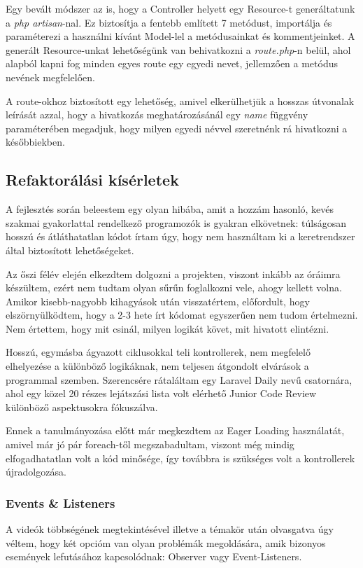 \documentclass[
]{thesis-ekf}
\theoremstyle{definition}
\theoremstyle{remark}
\begin{document}
                    Egy bevált módszer az is, hogy a Controller helyett egy Resource-t generáltatunk a \emph{php artisan}-nal. Ez biztosítja a fentebb említett 7 metódust, importálja és paraméterezi a használni kívánt Model-lel a metódusainkat és kommentjeinket. A generált Resource-unkat lehetőségünk van behivatkozni a \emph{route.php}-n belül, ahol alapból kapni fog minden egyes route egy egyedi nevet, jellemzően a metódus nevének megfelelően.

                    A route-okhoz biztosított egy lehetőség, amivel elkerülhetjük a hosszas útvonalak leírását azzal, hogy a hivatkozás meghatározásánál egy \emph{name} függvény paraméterében megadjuk, hogy milyen egyedi névvel szeretnénk rá hivatkozni a későbbiekben.
                    
                \subsection{Refaktorálási kísérletek}
                    A fejlesztés során beleestem egy olyan hibába, amit a hozzám hasonló, kevés szakmai gyakorlattal rendelkező programozók is gyakran elkövetnek: túlságosan hosszú és átláthatatlan kódot írtam úgy, hogy nem használtam ki a keretrendszer által biztosított lehetőségeket.

                    Az őszi félév elején elkezdtem dolgozni a projekten, viszont inkább az óráimra készültem, ezért nem tudtam olyan sűrűn foglalkozni vele, ahogy kellett volna. Amikor kisebb-nagyobb kihagyások után visszatértem, előfordult, hogy elszörnyülködtem, hogy a 2-3 hete írt kódomat egyszerűen nem tudom értelmezni. Nem értettem, hogy mit csinál, milyen logikát követ, mit hivatott elintézni.

                    Hosszú, egymásba ágyazott ciklusokkal teli kontrollerek, nem megfelelő elhelyezése a különböző logikáknak, nem teljesen átgondolt elvárások a programmal szemben. Szerencsére rátaláltam egy Laravel Daily nevű csatornára, ahol egy közel 20 részes lejátszási lista volt elérhető Junior Code Review\cite{LaravelDaily - CodeReview} különböző aspektusokra fókuszálva.

                    Ennek a tanulmányozása előtt már megkezdtem az Eager Loading használatát, amivel már jó pár foreach-től megszabadultam, viszont még mindig elfogadhatatlan volt a kód minősége, így továbbra is szükséges volt a kontrollerek újradolgozása.

                    \subsubsection{Events \& Listeners}
                    A videók többségének megtekintésével illetve a témakör után olvasgatva úgy véltem, hogy két opcióm van olyan problémák megoldására, amik bizonyos események lefutásához kapcsolódnak: Observer vagy Event-Listeners.
                    
\end{document}
